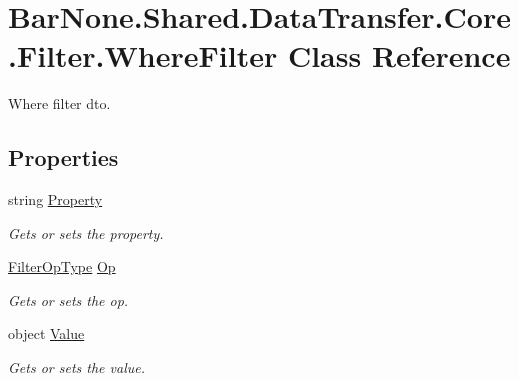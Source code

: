 \hypertarget{class_bar_none_1_1_shared_1_1_data_transfer_1_1_core_1_1_filter_1_1_where_filter}{}\section{Bar\+None.\+Shared.\+Data\+Transfer.\+Core.\+Filter.\+Where\+Filter Class Reference}
\label{class_bar_none_1_1_shared_1_1_data_transfer_1_1_core_1_1_filter_1_1_where_filter}


Where filter dto.  


\subsection*{Properties}
\begin{DoxyCompactItemize}
\item 
string \mbox{\hyperlink{class_bar_none_1_1_shared_1_1_data_transfer_1_1_core_1_1_filter_1_1_where_filter_ac8c7dc2f04369c473367659ebd9f1238}{Property}}
\begin{DoxyCompactList}\small\item\em Gets or sets the property. \end{DoxyCompactList}\item 
\mbox{\hyperlink{namespace_bar_none_1_1_shared_1_1_data_transfer_1_1_core_1_1_filter_a2a88b61b121c8cf76b6c2f4b97055daa}{Filter\+Op\+Type}} \mbox{\hyperlink{class_bar_none_1_1_shared_1_1_data_transfer_1_1_core_1_1_filter_1_1_where_filter_ada7745cb7ccc9af28b71f28006435486}{Op}}
\begin{DoxyCompactList}\small\item\em Gets or sets the op. \end{DoxyCompactList}\item 
object \mbox{\hyperlink{class_bar_none_1_1_shared_1_1_data_transfer_1_1_core_1_1_filter_1_1_where_filter_a6fa777394f36378cd7fda84869958f46}{Value}}
\begin{DoxyCompactList}\small\item\em Gets or sets the value. \end{DoxyCompactList}\end{DoxyCompactItemize}


